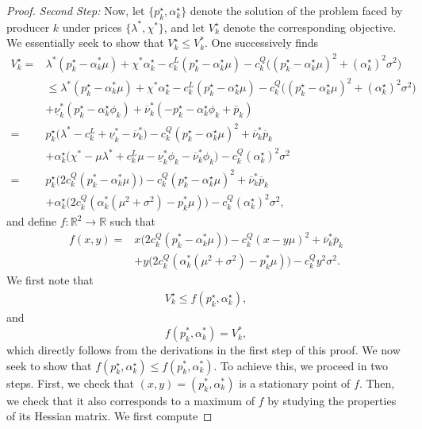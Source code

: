 \documentclass{article}
\begin{document}
\begin{proof}
\textit{Second Step:} Now, let $\{p_k^\star, \alpha_k^\star\}$ denote the solution of the problem faced by producer $k$ under prices $\{\lambda^*, \chi^*\}$, and let $V_k^\star$ denote the corresponding objective. We essentially seek to show that $V_k^\star \le V_k^*$. One successively finds
\begin{align*}
    V_k^\star =& \lambda^*(p_k^\star - \alpha_k^* \mu) + \chi^* \alpha_k^\star - c_k^L(p_k^\star - \alpha_k^\star \mu) - c_k^Q\big((p_k^\star - \alpha_k^\star \mu)^2 + (\alpha_k^\star)^2\sigma^2\big)\\
    &\le \lambda^*(p_k^\star - \alpha_k^* \mu) + \chi^* \alpha_k^\star - c_k^L(p_k^\star - \alpha_k^\star \mu) - c_k^Q\big((p_k^\star - \alpha_k^\star \mu)^2 + (\alpha_k^\star)^2\sigma^2\big)\\
    &+ \underline{\nu}_k^* (p_k^\star - \alpha_k^\star \phi_k) + \overline{\nu}_k^*(-p_k^\star - \alpha_k^\star \phi_k + \bar{p}_k)\\
    =& p_k^\star\big(\lambda^* - c_k^L + \underline{\nu}_k^* - \overline{\nu}_k^*\big) - c_k^Q(p_k^\star - \alpha_k^\star \mu)^2 + \overline{\nu}_k^* \overline{p}_k\\
    &+ \alpha_k^\star\big(\chi^* - \mu \lambda^* + c_k^L \mu - \underline{\nu}_k^* \phi_k - \overline{\nu}_k^* \phi_k\big) - c_k^Q (\alpha_k^\star)^2 \sigma^2 \\
   =& p_k^\star\big(2c_k^Q(p_k^* - \alpha_k^* \mu)\big) - c_k^Q(p_k^\star - \alpha_k^\star \mu)^2 + \overline{\nu}_k^* \overline{p}_k\\ 
    &+ \alpha_k^\star\big(2c_k^Q(\alpha_k^*(\mu^2+\sigma^2) - p_k^* \mu)\big) - c_k^Q (\alpha_k^\star)^2 \sigma^2,
\end{align*}
and define $f:\mathbb{R}^2 \rightarrow \mathbb{R}$ such that
\begin{align*}
f(x, y) =& x \big(2c_k^Q(p_k^* - \alpha_k^* \mu)\big) - c_k^Q(x - y \mu)^2 + \overline{\nu}_k^* \overline{p}_k\\ 
    &+ y \big(2c_k^Q(\alpha_k^*(\mu^2+\sigma^2) - p_k^* \mu)\big) - c_k^Q y^2 \sigma^2.
\end{align*}
We first note that
\begin{align*}
V_k^\star \le f(p_k^\star, \alpha_k^\star),
\end{align*} 
and
\begin{equation*}
f(p_k^*, \alpha_k^*) = V_k^*,
\end{equation*}
which directly follows from the derivations in the first step of this proof. We now seek to show that $f(p_k^\star, \alpha_k^\star) \le f(p_k^*, \alpha_k^*)$. To achieve this, we proceed in two steps. First, we check that $(x, y) = (p_k^*, \alpha_k^*)$ is a stationary point of $f$. Then, we check that it also corresponds to a maximum of $f$ by studying the properties of its Hessian matrix. We first compute

\end{proof}
\end{document}

